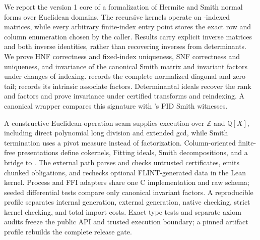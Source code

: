 We report the version 1 core of a \Lean{} formalization of Hermite and Smith
normal forms over Euclidean domains. The recursive kernels operate on
-indexed matrices, while every arbitrary finite-index entry point
stores the exact row and column enumeration chosen by the caller. Results carry
explicit inverse matrices and both inverse identities, rather than recovering
inverses from determinants. We prove HNF correctness and fixed-index
uniqueness, SNF correctness and uniqueness, and invariance of the canonical
 Smith matrix and invariant factors under changes of indexing.
 records the complete normalized diagonal and zero tail;
 records its intrinsic associate factors. Determinantal
ideals recover the rank and factors and prove invariance under certified
transforms and reindexing. A canonical wrapper compares this signature with
\mathlib{}'s PID Smith witnesses.

A constructive Euclidean-operation seam supplies execution over
\(\mathbb Z\) and \(\mathbb Q[X]\), including direct polynomial long division
and extended gcd, while Smith termination uses a pivot measure instead of
factorization. Column-oriented finite-free presentations define cokernels,
Fitting ideals, Smith decompositions, and a bridge to
. The external path parses and checks untrusted
certificates, emits chunked  obligations, and rechecks
optional FLINT-generated data in the Lean kernel. Process and FFI adapters
share one C implementation and raw schema; seeded differential tests compare
only canonical invariant factors. A reproducible profile separates internal
generation, external generation, native checking, strict kernel checking, and
total import costs. Exact type tests and separate axiom audits freeze the
public API and trusted execution boundary; a pinned artifact profile rebuilds
the complete release gate.

